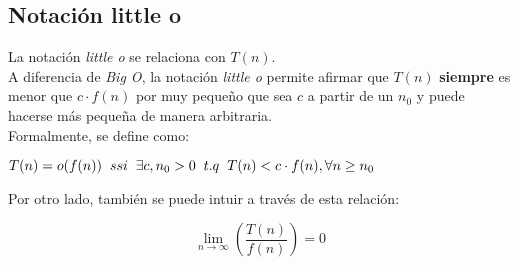 \subsection{Notación little o}
La notación \textit{little o} se relaciona con $T(n)$.\\

A diferencia de \textit{Big O}, la notación \textit{little o} permite
afirmar que $T(n)$ \textbf{siempre} es menor que $c\cdot f(n)$ por muy
pequeño que sea $c$ a partir de un $n_{0}$ y puede hacerse más pequeña
de manera arbitraria.\\

Formalmente, se define como:

\begin{center}
  \(T(n) = o(f(n))\hspace{0.2cm}ssi\hspace{0.2cm}\exists c, n_{0} > 0\hspace{0.2cm}t.q\hspace{0.2cm}T(n) < c\cdot f(n), \forall{n} \geq n_{0}\)
\end{center}

Por otro lado, también se puede intuir a través de esta relación:

\begin{center}
  \[
    \lim_{n\to\infty} \left(\frac{T(n)}{f(n)}\right) = 0
  \]
\end{center}
